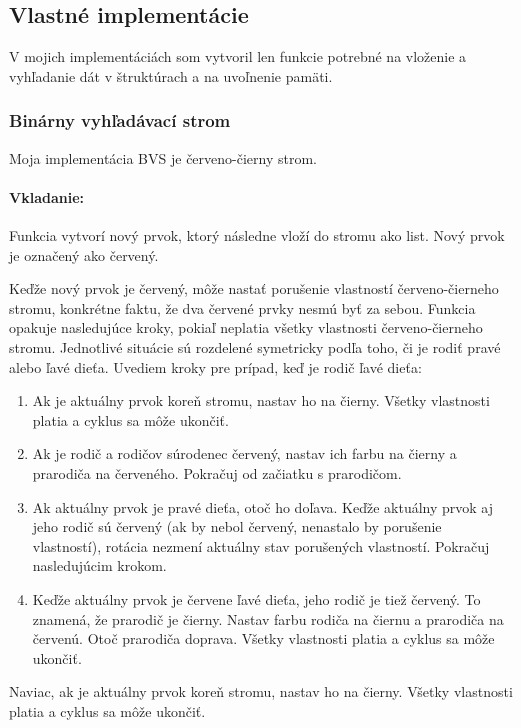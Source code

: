 \documentclass[a4paper,slovak,12pt]{article}
\begin{document}
    \subsection{Vlastné implementácie}\label{subsec:vlastne-implementacie}

    V mojich implementáciách som vytvoril len funkcie potrebné na vloženie a vyhľadanie dát v štruktúrach a na
    uvoľnenie pamäti.

    \subsubsection{Binárny vyhľadávací strom}\label{subsubsec:cerveno-cierny-strom}

    Moja implementácia BVS je červeno-čierny strom.

    \paragraph{Vkladanie:}
    Funkcia vytvorí nový prvok, ktorý následne vloží do stromu ako list.
    Nový prvok je označený ako červený.

    Keďže nový prvok je červený, môže nastať porušenie vlastností červeno-čierneho stromu,
    konkrétne faktu, že dva červené prvky nesmú byť za sebou.
    Funkcia opakuje nasledujúce kroky, pokiaľ neplatia všetky vlastnosti červeno-čierneho stromu.
    Jednotlivé situácie sú rozdelené symetricky podľa toho, či je rodiť pravé alebo ľavé dieťa.
    Uvediem kroky pre prípad, keď je rodič ľavé dieťa:
    \begin{enumerate}
        \item Ak je aktuálny prvok koreň stromu, nastav ho na čierny.
        Všetky vlastnosti platia a cyklus sa môže ukončiť.
        \item Ak je rodič a rodičov súrodenec červený, nastav ich farbu na čierny a prarodiča na červeného.
        Pokračuj od začiatku s prarodičom.
        \item Ak aktuálny prvok je pravé dieťa, otoč ho doľava.
        Keďže aktuálny prvok aj jeho rodič sú červený (ak by nebol červený, nenastalo by porušenie vlastností), rotácia
        nezmení aktuálny stav porušených vlastností.
        Pokračuj nasledujúcim krokom.
        \item Keďže aktuálny prvok je červene ľavé dieťa, jeho rodič je tiež červený.
        To znamená, že prarodič je čierny.
        Nastav farbu rodiča na čiernu a prarodiča na červenú.
        Otoč prarodiča doprava.
        Všetky vlastnosti platia a cyklus sa môže ukončiť.
    \end{enumerate}
    Naviac, ak je aktuálny prvok koreň stromu, nastav ho na čierny.
    Všetky vlastnosti platia a cyklus sa môže ukončiť.
\end{document}
